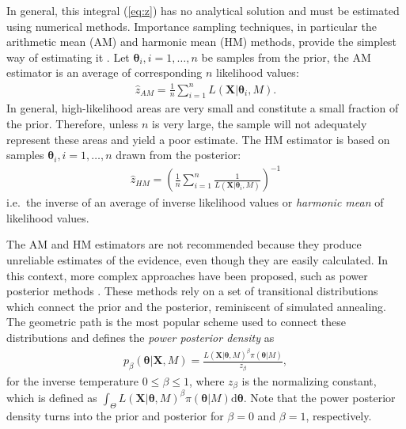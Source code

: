 \documentclass[aps,reprint,amsmath,amssymb,showpacs,showkeys]{revtex4-1}%
\begin{document}
In general, this integral (\ref{eq:z}) has no analytical solution and must be estimated using numerical methods.  Importance sampling techniques, in particular the arithmetic mean (AM) and harmonic mean (HM) methods,  provide the simplest way of estimating it \citep{Newton:Raftery:1994}.
Let $\bm{\theta}_i, i=1,\ldots,n$ be samples from the prior, the AM estimator is an average of corresponding $n$ likelihood values:
\begin{align}
\label{eq:AM}
\widehat{z}_{AM} = \frac{1}{n}\sum_{i=1}^n L(\bm{X}|\bm{\theta}_i,M).
\end{align}
In general, high-likelihood areas are very small and  constitute a small fraction of the prior.  Therefore, unless $n$ is very large, the sample will not adequately represent these areas and yield a poor estimate.  The HM estimator is  based on samples 
$\bm{\theta}_i, i=1,\ldots,n$
 drawn from the posterior:
\begin{align}
\label{eq:HM}
\widehat{z}_{HM} = \left( \frac{1}{n}\sum_{i=1}^n \frac{1}{ L(\bm{X}|\bm{\theta}_i,M)} \right)^{-1}
\end{align}
i.e.\ the inverse of an average of inverse likelihood values or {\it harmonic mean} of likelihood values.

The AM and HM estimators are not recommended because they produce unreliable estimates of the evidence, even though they are easily calculated.   In this context, more complex approaches have been proposed, such as power posterior methods \cite{Xie:Lewis:Fan:Kuo:Chen:2011, Lartillot:Philippe:2006, Friel:2008, Neal:2001}.  These methods rely on a set of transitional distributions which connect the prior and the posterior, reminiscent of simulated annealing.  The geometric path is the most popular scheme used to connect these distributions and defines the \textit{power posterior density} as
\begin{align}\label{eq:powerposterior}
p_{\beta}(\bm{\theta}|\bm{X}, M) = \frac{L(\bm{X}|\bm{\theta},M)^{\beta}\pi(\bm{\theta}|M)}{z_{\beta}},
\end{align}
for the inverse temperature $0\leq\beta\leq 1$, where $z_{\beta}$ is the normalizing constant, which is defined as $\int_{\Theta} L(\bm{X}|\bm{\theta},M)^{\beta}\pi(\bm{\theta}|M) \text{d}\bm{\theta}$. Note that the power posterior density turns into the prior and posterior for $\beta = 0$ and $\beta = 1$, respectively.   
\end{document}
